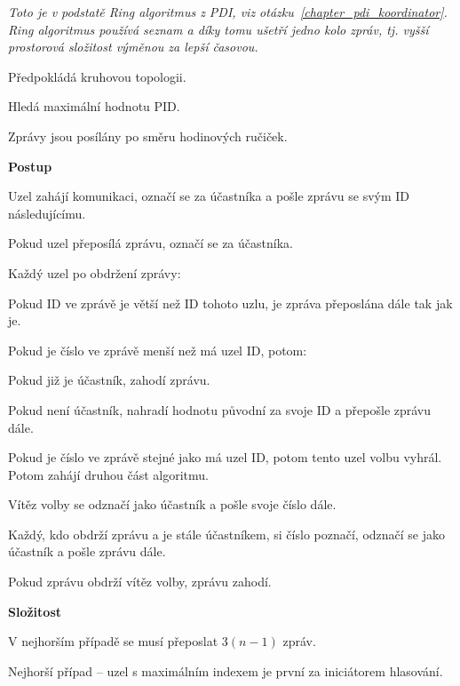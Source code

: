 \begin{compactitem}
    \item \textit{Toto je v podstatě Ring algoritmus z PDI, viz otázku~\ref{chapter_pdi_koordinator}. Ring algoritmus používá seznam a díky tomu ušetří jedno kolo zpráv, tj. vyšší prostorová složitost výměnou za lepší časovou.}

    \item Předpokládá kruhovou topologii.
    \item Hledá maximální hodnotu PID.
    \item Zprávy jsou posílány po směru hodinových ručiček.

    \item \textbf{Postup} \begin{compactenum}
        \item Uzel zahájí komunikaci, označí se za účastníka a pošle zprávu se svým ID následujícímu.
        \item Pokud uzel přeposílá zprávu, označí se za účastníka.
        \item Každý uzel po obdržení zprávy: \begin{compactenum}
            \item Pokud ID ve zprávě je větší než ID tohoto uzlu, je zpráva přeposlána dále tak jak je.
            \item Pokud je číslo ve zprávě menší než má uzel ID, potom: \begin{compactenum}
                \item Pokud již je účastník, zahodí zprávu.
                \item Pokud není účastník, nahradí hodnotu původní za svoje ID a přepošle zprávu dále.
            \end{compactenum}
            \item Pokud je číslo ve zprávě stejné jako má uzel ID, potom tento uzel volbu vyhrál. Potom zahájí druhou část algoritmu.
        \end{compactenum}
        \item Vítěz volby se odznačí jako účastník a pošle svoje číslo dále.
        \item Každý, kdo obdrží zprávu a je stále účastníkem, si číslo poznačí, odznačí se jako účastník a pošle zprávu dále.
        \item Pokud zprávu obdrží vítěz volby, zprávu zahodí.
    \end{compactenum}

    \item \textbf{Složitost} \begin{compactitem}
        \item V nejhorším případě se musí přeposlat $3(n-1)$ zpráv.
        \item Nejhorší případ -- uzel s maximálním indexem je první za iniciátorem hlasování.
    \end{compactitem}


\end{compactitem}
